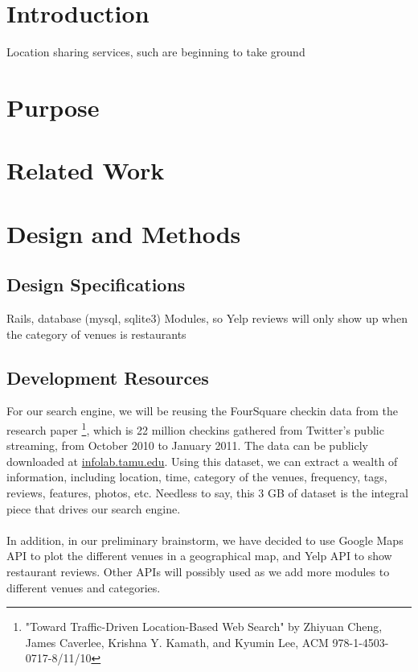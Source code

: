 \documentclass{article}
\begin{document}
%


%

%
\section{Introduction}
Location sharing services, such 
are beginning to take ground

\section{Purpose}

\section{Related Work}

\section{Design and Methods}
\subsection{Design Specifications}
Rails, database (mysql, sqlite3)
Modules, so Yelp reviews will only show up when the category of venues is restaurants

\subsection{Development Resources}
For our search engine, we will be reusing the FourSquare checkin data from the research paper
\footnote{"Toward Traffic-Driven Location-Based Web Search" by Zhiyuan Cheng, James Caverlee, Krishna Y. Kamath, and Kyumin Lee, ACM 978-1-4503-0717-8/11/10},
which is 22 million checkins gathered from Twitter's public streaming, from October 2010 to January 2011. 
The data can be publicly downloaded at \href{http://infolab.tamu.edu/static/users/zhiyuan/icwsm_2011.zip}{infolab.tamu.edu}.
Using this dataset, we can extract a wealth of information, including location, time, category of the venues, frequency, tags, reviews, features, photos, etc.
Needless to say, this 3 GB of dataset is the integral piece that drives our search engine.
\\ \\
In addition, in our preliminary brainstorm, we have decided to use Google Maps API to plot the different venues in a geographical map, and
Yelp API to show restaurant reviews. Other APIs will possibly used as we add more modules to different venues and categories.
\end{document}
